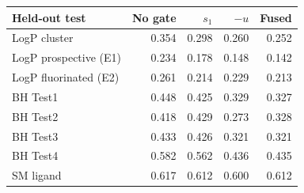 \begin{tabular}{@{}lrrrr@{}}
\toprule
Held-out test & No gate & $s_1$ & $-u$ & Fused \\
\midrule
LogP cluster & 0.354 & 0.298 & 0.260 & 0.252 \\
LogP prospective (E1) & 0.234 & 0.178 & 0.148 & 0.142 \\
LogP fluorinated (E2) & 0.261 & 0.214 & 0.229 & 0.213 \\
BH Test1 & 0.448 & 0.425 & 0.329 & 0.327 \\
BH Test2 & 0.418 & 0.429 & 0.273 & 0.328 \\
BH Test3 & 0.433 & 0.426 & 0.321 & 0.321 \\
BH Test4 & 0.582 & 0.562 & 0.436 & 0.435 \\
SM ligand & 0.617 & 0.612 & 0.600 & 0.612 \\
\bottomrule
\end{tabular}